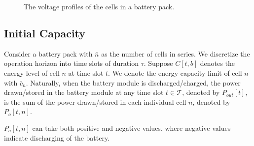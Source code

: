 \documentclass[10pt,twocolumn]{IEEEtran}
\begin{document}
\begin{figure}[t]
\centering
\vspace{-0.25cm}
{} \vspace{-0.3cm}
\caption{The voltage profiles of the cells in a battery pack.}
\vspace{-0.4cm}
\label{fig:packoperation}
\end{figure}

\vspace{-0.1cm}

\subsection{Initial Capacity}
Consider a battery pack with $\overline{n}$  as the number of cells in series. 
We discretize the operation horizon into time slots of duration $\tau$.
Suppose $C[t, b]$ denotes the energy level of cell $n$ at time slot $t$.
We  denote the energy capacity limit of cell $n$ with $\overline{c}_n$.
Naturally, when the battery module is discharged/charged,  the power drawn/stored in the battery module at any time slot $t \in \mathcal{T}$, denoted by $P_{out}[t]$,  is the sum of the power drawn/stored in each individual cell $n$, denoted by $P_{o}[t,n]$.

$P_{o}[t,n]$ can take both positive and negative values, where negative values indicate discharging of the battery.
\end{document}
